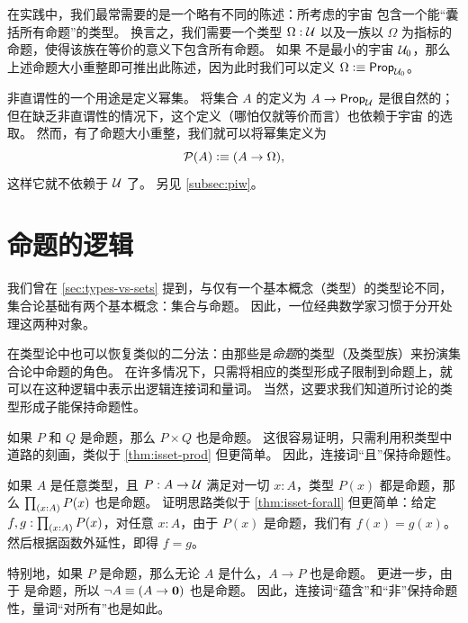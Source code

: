 在实践中，我们最常需要的是一个略有不同的陈述：所考虑的宇宙 \UU 包含一个能``囊括所有命题''的类型。
换言之，我们需要一个类型 $\Omega:\mathcal{U}$ 以及一族以 $\Omega$ 为指标的命题，使得该族在等价的意义下包含所有命题。
如果 \UU 不是最小的宇宙 $\mathcal{U}_0$，那么上述命题大小重整即可推出此陈述，因为此时我们可以定义 $\Omega\vcentcolon\equiv \mathsf{Prop}_{\mathcal{U}_0}$。

非直谓性的一个用途是定义幂集。
将集合 $A$ 的定义为 $A\to\mathsf{Prop}_{\mathcal{U}}$ 是很自然的；但在缺乏非直谓性的情况下，这个定义（哪怕仅就等价而言）也依赖于宇宙 \UU 的选取。
然而，有了命题大小重整，我们就可以将幂集定义为
%
\[ \mathcal{P}(A) \vcentcolon\equiv (A\to\Omega),\]
这样它就不依赖于 $\mathcal{U}$ 了。
另见 \cref{subsec:piw}。

\section{命题的逻辑}
\label{subsec:logic-hprop}

%
我们曾在 \cref{sec:types-vs-sets} 提到，与仅有一个基本概念（类型）的类型论不同，集合论基础有两个基本概念：集合与命题。
因此，一位经典数学家习惯于分开处理这两种对象。

在类型论中也可以恢复类似的二分法：由那些是\emph{命题}的类型（及类型族）来扮演集合论中命题的角色。
在许多情况下，只需将相应的类型形成子限制到命题上，就可以在这种逻辑中表示出逻辑连接词和量词。
当然，这要求我们知道所讨论的类型形成子能保持命题性。

\begin{eg}
  如果 $P$ 和 $Q$ 是命题，那么 $P\times Q$ 也是命题。
  这很容易证明，只需利用积类型中道路的刻画，类似于 \cref{thm:isset-prod} 但更简单。
  因此，连接词``且''保持命题性。
\end{eg}

\begin{eg}\label{thm:isprop-forall}
  如果 $A$ 是任意类型，且 $P:A\to \mathcal{U}$ 满足对一切 $x:A$，类型 $P(x)$ 都是命题，那么 $\prd{x:A} P(x)$ 也是命题。
  证明思路类似于 \cref{thm:isset-forall} 但更简单：给定 $f,g:\prd{x:A} P(x)$，对任意 $x:A$，由于 $P(x)$ 是命题，我们有 $f(x)=g(x)$。
  然后根据函数外延性，即得 $f=g$。

  特别地，如果 $P$ 是命题，那么无论 $A$ 是什么，$A\to P$ 也是命题。
  更进一步，由于 \emptyt 是命题，所以 $\neg A \equiv (A\to\mathbf{0})$ 也是命题。
  因此，连接词``蕴含''和``非''保持命题性，量词``对所有''也是如此。
\end{eg}

